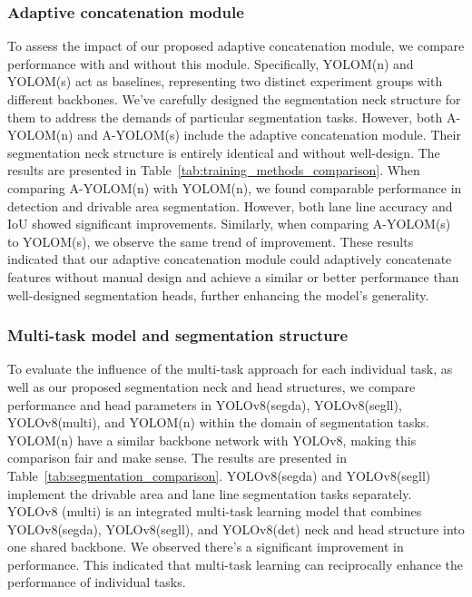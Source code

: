 \documentclass[lettersize,journal]{IEEEtran}
\begin{document}
{\subsubsection{Adaptive concatenation module}
\label{subsubsec: Adaptive concatenation module}
To assess the impact of our proposed adaptive concatenation module, we compare performance with and without this module. Specifically, YOLOM(n) and YOLOM(s) act as baselines, representing two distinct experiment groups with different backbones. We've carefully designed the segmentation neck structure for them to address the demands of particular segmentation tasks. However, both A-YOLOM(n) and A-YOLOM(s) include the adaptive concatenation module. Their segmentation neck structure is entirely identical and without well-design. The results are presented in Table~\ref{tab:training_methods_comparison}. When comparing A-YOLOM(n) with YOLOM(n), we found comparable performance in detection and drivable area segmentation. However, both lane line accuracy and IoU showed significant improvements. Similarly, when comparing A-YOLOM(s) to YOLOM(s), we observe the same trend of improvement. These results indicated that our adaptive concatenation module could adaptively concatenate features without manual design and achieve a similar or better performance than well-designed segmentation heads, further enhancing the model’s generality.



\subsubsection{Multi-task model and segmentation structure}
\label{subsubsec: Multi-task model and segmentation structure}
To evaluate the influence of the multi-task approach for each individual task, as well as our proposed segmentation neck and head structures, we compare performance and head parameters in YOLOv8(segda), YOLOv8(segll), YOLOv8(multi), and YOLOM(n) within the domain of segmentation tasks. YOLOM(n) have a similar backbone network with YOLOv8, making this comparison fair and make sense. The results are presented in Table~\ref{tab:segmentation_comparison}. YOLOv8(segda) and YOLOv8(segll) implement the drivable area and lane line segmentation tasks separately. YOLOv8 (multi) is an integrated multi-task learning model that combines YOLOv8(segda), YOLOv8(segll), and YOLOv8(det) neck and head structure into one shared backbone. We observed there's a significant improvement in performance. This indicated that multi-task learning can reciprocally enhance the performance of individual tasks. 

}
\end{document}

